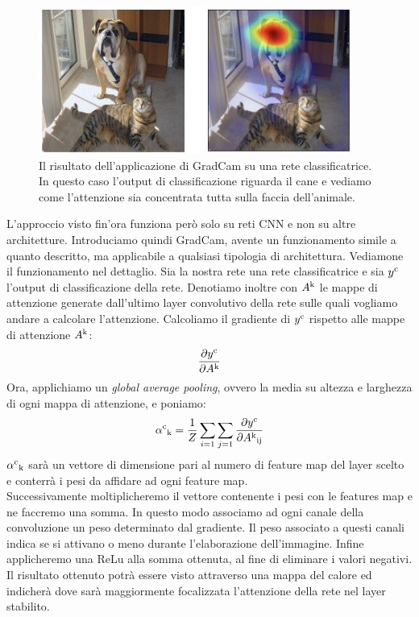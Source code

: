 \begin{figure}[H]
  \begin{center}
    \includegraphics[width=0.8\columnwidth]{images/gradcam example.jpg}
  \end{center}
  \caption{Il risultato dell'applicazione di GradCam su una rete classificatrice. In questo caso l'output di classificazione riguarda il cane e vediamo come l'attenzione sia concentrata tutta sulla faccia dell'animale.}
  \label{fig:GradCam example}
\end{figure}
L'approccio visto fin'ora funziona però solo su reti CNN e non su altre architetture. Introduciamo quindi GradCam, avente un funzionamento simile a quanto descritto, ma applicabile a qualsiasi tipologia di architettura.
Vediamone il funzionamento nel dettaglio. Sia la nostra rete una rete classificatrice e sia $y\textsuperscript{c}$ l'output di classificazione della rete. Denotiamo inoltre con $A\textsuperscript{k}$ le mappe di attenzione generate dall'ultimo layer convolutivo della rete sulle quali vogliamo andare a calcolare l'attenzione. Calcoliamo il gradiente di $y\textsuperscript{c}$ rispetto alle mappe di attenzione $A\textsuperscript{k}$:
$$\frac{\partial y\textsuperscript{c}}{\partial A\textsuperscript{k}}
$$
Ora, applichiamo un \emph{global average pooling}, ovvero la media su altezza e larghezza di ogni mappa di attenzione, e poniamo:
$$\alpha\textsuperscript{c}\textsubscript{k} =
\frac{1}{Z} \sum_{i=1} \sum_{j=1} \frac{\partial y\textsuperscript{c}}{\partial A\textsuperscript{k}\textsubscript{ij}}$$
$\alpha\textsuperscript{c}\textsubscript{k}$ sarà un vettore di dimensione pari al numero di feature map del layer scelto e conterrà i pesi da affidare ad ogni feature map.
\\Successivamente moltiplicheremo il vettore contenente i pesi con le features map e ne faccremo una somma. In questo modo associamo ad ogni canale della convoluzione un peso determinato dal gradiente. Il peso associato a questi canali indica se si attivano o meno durante l'elaborazione dell'immagine. Infine applicheremo una ReLu alla somma ottenuta, al fine di eliminare i valori negativi. \\Il risultato ottenuto potrà essere visto attraverso una mappa del calore ed indicherà dove sarà maggiormente focalizzata l'attenzione della rete nel layer stabilito.

